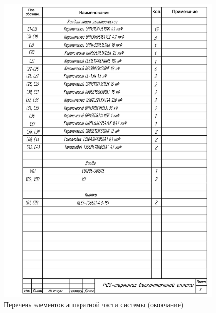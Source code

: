 \begin{figure}[H]
    \centering
    \includegraphics[height=0.9\textheight]{appendices/elements_2.pdf}
    \caption{Перечень элементов аппаратной части системы (окончание)}
\end{figure}

